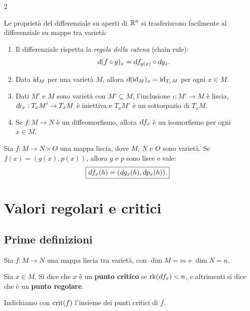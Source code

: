 \begin{multicols*}{2}
    \begin{remark}
        Le proprietà del differenziale su aperti di $\mathbb{R}^n$ si trasferiscono
        facilmente al differenziale su mappe tra varietà:
        \begin{enumerate}[(i.)]
            \item Il differenziale rispetta la \textit{regola della catena} (chain rule):
                  \[ \dif(f \circ g)_x = \dif f_{g(x)} \circ \dif g_x. \]
            \item Data $\operatorname{id}_M$ per una varietà $M$, allora $\dif (\id_M)_x = \id_{T_x M}$ per ogni $x \in M$.
            \item Dati $M'$ e $M$ sono varietà con $M' \subseteq M$, l'inclusione $\iota : M' \to M$ è liscia,
                  $\dif \iota_x : T_x M' \to T_x M$ è iniettiva e $T_x M'$ è un sottospazio di $T_x M$.
            \item Se $f : M \to N$ è un diffeomorfismo, allora $\dif f_x$ è un isomorfismo per ogni $x \in M$.
        \end{enumerate}
    \end{remark}

    \begin{proposition} \label{prop:diff_prodotto}
        Sia $f : M \to N \times O$ una mappa liscia, dove $M$, $N$ e $O$ sono varietà.
        Se $f(x) = (g(x), p(x))$, allora $g$ e $p$ sono lisce e vale:
        \[
            \boxed{\dif f_x(h) = (\dif g_x(h), \dif p_x(h)).}
        \]
    \end{proposition}

    \section{Valori regolari e critici}

    \subsection{Prime definizioni}

    \begin{definition}
        Sia $f : M \to N$ una mappa liscia tra varietà, con
        $\dim M = m$ e $\dim N = n$. \smallskip

        Sia $x \in M$. Si dice che $x$ è un \textbf{punto critico}
        se $\rk(\dif f_x) < n$, e altrimenti si dice che è un
        \textbf{punto regolare}. \smallskip

        Indichiamo con $\operatorname{crit}(f)$ l'insieme dei punti critici di
        $f$.
    \end{definition}


\end{multicols*}
